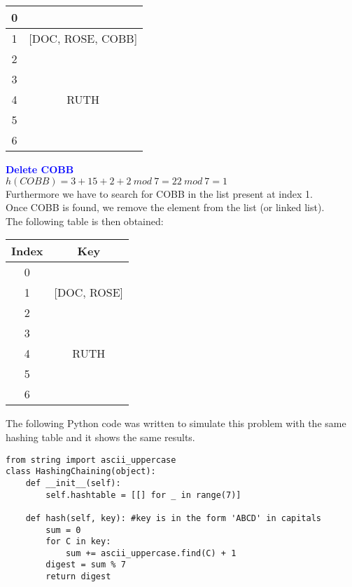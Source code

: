 \documentclass[11pt]{article}
\begin{document}
\begin{enumerate}
\begin{center}
\begin{tabular}{ | c | c | }
        0 & \\
        \hline
        1 & [DOC, ROSE, COBB]\\
        \hline
        2 & \\
        \hline
        3 & \\
        \hline
        4 & RUTH\\
        \hline
        5 & \\
        \hline
        6 & \\
        \hline
    \end{tabular}
    \end{center}
\textbf{\textcolor{blue}{Delete COBB}}
    \\ $h(COBB)=3+15+2+2\ mod\ 7 = 22\ mod\ 7 = 1$
    \\ Furthermore we have to search for COBB in the list present at index 1.
    \\ Once COBB is found, we remove the element from the list (or linked list).
    \\ The following table is then obtained:
    \begin{center}
    \begin{tabular}{ | c | c | } 
        \hline
        Index & Key \\ 
        \hline\hline
        0 & \\
        \hline
        1 & [DOC, ROSE]\\
        \hline
        2 & \\
        \hline
        3 & \\
        \hline
        4 & RUTH\\
        \hline
        5 & \\
        \hline
        6 & \\
        \hline
    \end{tabular}
    \end{center}
    
    The following Python code was written to simulate this problem with the same hashing table and it shows the same results.
    \begin{verbatim}
from string import ascii_uppercase        
class HashingChaining(object):
    def __init__(self):
        self.hashtable = [[] for _ in range(7)]
        
    def hash(self, key): #key is in the form 'ABCD' in capitals
        sum = 0
        for C in key:
            sum += ascii_uppercase.find(C) + 1
        digest = sum % 7
        return digest
        

\end{verbatim}
\end{enumerate}
\end{document}

